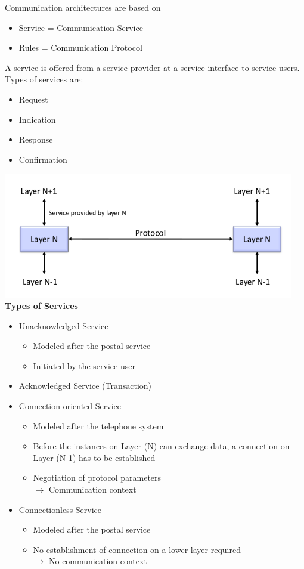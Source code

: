 \documentclass[11pt,ngerman]{article}
\begin{document}
\noindent Communication	architectures	are	based	on
\begin{itemize}[noitemsep,nolistsep]
\item  Service	=	Communication	Service
\item Rules	=	Communication	Protocol

\end{itemize}
A	service	is	offered	from	a	service	provider at	a	service	interface	
to	service	users.\\
Types	of	services	are:
\begin{itemize}[noitemsep,nolistsep]
\item Request
\item Indication
\item Response
\item Confirmation
\end{itemize}

\includegraphics[width=5in]{images/Selection_007.png}\\

\textbf{Types of Services}
\begin{itemize}[noitemsep,nolistsep]
\item Unacknowledged	Service
\begin{itemize}[noitemsep,nolistsep]
\item Modeled	after	the	postal	service
\item Initiated	by	the	service	user
\end{itemize}
\item Acknowledged	Service (Transaction)
\item Connection-oriented	Service
\begin{itemize}[noitemsep,nolistsep]
\item Modeled	after	the	telephone	system
\item Before	the	instances	on	Layer-(N)	can	
exchange	data,	a	connection	on	
Layer-(N-1)	has	to	be	established
\item Negotiation	of	protocol	parameters\\
$\rightarrow$ Communication	context
\end{itemize}
\item Connectionless	Service
\begin{itemize}[noitemsep,nolistsep]
\item  Modeled	after	the	postal	service
\item No	establishment	of	connection	on	a	
lower	layer	required\\
$\rightarrow$ No	communication	context
\end{itemize}
\end{itemize}
\end{document}
